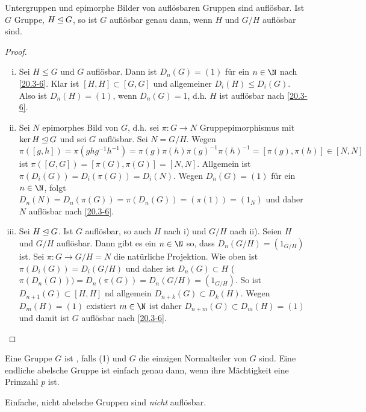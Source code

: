 \begin{st} \label{20.3-7}
	Untergruppen und epimorphe Bilder von auflösbaren Gruppen sind auflösbar.
	Ist $G$ Gruppe, $H \mathbin{\trianglelefteq} G$, so ist $G$ auflösbar genau dann, wenn $H$ und $G / H$ auflösbar sind.
	\begin{proof}
		\begin{enumerate}[i)]
			\item
				Sei $H \le G$ und $G$ auflösbar.
				Dann ist $D_n(G) = (1)$ für ein $n \in \N$ nach \ref{20.3-6}.
				Klar ist $[H, H] \subset [G, G]$ und allgemeiner $D_i(H) \le D_i(G)$.
				Also ist $D_n(H) = (1)$, wenn $D_n(G) = 1$, d.h. $H$ ist auflösbar nach \ref{20.3-6}.
			\item
				Sei $N$ epimorphes Bild von $G$, d.h. sei $\pi: G \to N$ Gruppepimorphismus mit $\ker H \mathbin{\trianglelefteq} G$ und sei $G$ auflösbar.
				Sei \oBdA $N = G / H$.
				Wegen $\pi([g,h]) = \pi(ghg^{-1}h^{-1}) = \pi(g)\pi(h)\pi(g)^{-1}\pi(h)^{-1} = [\pi(g), \pi(h)] \in [N, N]$ ist $\pi([G,G]) = [\pi(G), \pi(G)] = [N, N]$.
				Allgemein ist $\pi(D_i(G)) = D_i(\pi(G)) = D_i(N)$.
				Wegen $D_n(G) = (1)$ für ein $n \in \N$, folgt $D_n(N) = D_n(\pi(G)) = \pi(D_n(G)) = (\pi(1)) = (1_N)$ und daher $N$ auflösbar nach \ref{20.3-6}.
			\item
				Sei $H \mathbin{\trianglelefteq} G$.
				Ist $G$ auflösbar, so auch $H$ nach i) und $G / H$ nach ii).
				Seien $H$ und $G / H$ auflösbar.
				Dann gibt es ein $n \in \N$ so, dass $D_n(G / H) = (1_{G/H})$ ist.
				Sei $\pi: G \to G /H = N$ die natürliche Projektion.
				Wie oben ist $\pi(D_i(G)) = D_i(G / H)$ und daher ist $D_n(G) \subset H$ ($\pi(D_n(G))) = D_n(\pi(G)) = D_n(G / H) = (1_{G/H})$.
				So ist $D_{n+1}(G) \subset [H, H]$ nd allgemein $D_{n+k}(G) \subset D_k(H)$.
				Wegen $D_m(H) = (1)$ existiert $m \in \N$ ist daher $D_{n+m}(G) \subset D_m(H) = (1)$ und damit ist $G$ auflösbar nach \ref{20.3-6}.
		\end{enumerate}

	\end{proof}
\end{st}

\begin{df} \label{20.3-8}
	Eine Gruppe $G$ ist , falls (1) und $G$ die einzigen Normalteiler von $G$ sind.
	Eine endliche abelsche Gruppe ist einfach genau dann, wenn ihre Mächtigkeit eine Primzahl $p$ ist.
	\begin{note}
		Einfache, nicht abelsche Gruppen sind \emph{nicht} auflösbar.
	\end{note}
\end{df}

